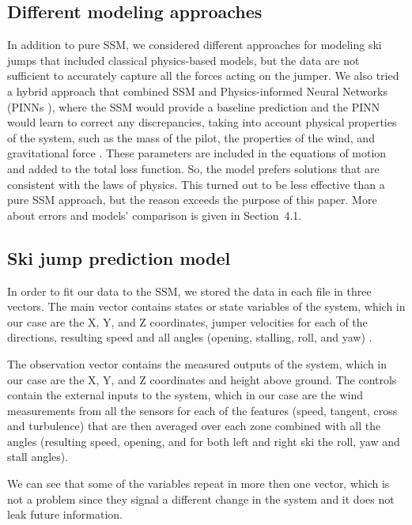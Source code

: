\documentclass[sigconf]{acmart}
\begin{document}
\subsection{Different modeling approaches}
In addition to pure SSM, we considered different approaches for modeling ski
jumps that included classical physics-based models, but the data are not
sufficient to accurately capture all the forces acting on the jumper. We also
tried a hybrid approach that combined SSM and Physics-informed Neural Networks
(PINNs \cite{cai2021}), where the SSM would provide a baseline prediction and
the PINN would learn to correct any discrepancies, taking into account physical
properties of the system, such as the mass of the pilot, the properties of the
wind, and gravitational force \cite{mueller2006}. These parameters are included
in the equations of motion and added to the total loss function. So, the model
prefers solutions that are consistent with the laws of physics. This turned out
to be less effective than a pure SSM approach, but the reason exceeds the
purpose of this paper. More about errors and models’ comparison is given in
Section~4.1.

\subsection{Ski jump prediction model}
In order to fit our data to the SSM, we stored the data in each file in three
vectors. The main vector contains states or state variables of the system,
which in our case are the X, Y, and Z coordinates, jumper velocities for each 
of the directions, resulting speed and all angles (opening, stalling, roll, and 
yaw) \cite{mueller2006}.

The observation vector contains the measured outputs of the system, which in
our case are the X, Y, and Z coordinates and height above ground. The controls
contain the external inputs to the system, which in our case are the wind
measurements from all the sensors for each of the features (speed, tangent, 
cross and turbulence) that are then averaged over each zone  combined with 
all the angles (resulting speed, opening, and for both left and right ski the 
roll, yaw and stall angles).

We can see that some of the variables repeat in more then one vector, 
which is not a problem since they signal a different change in the system and it does
not leak future information. 
\end{document}
